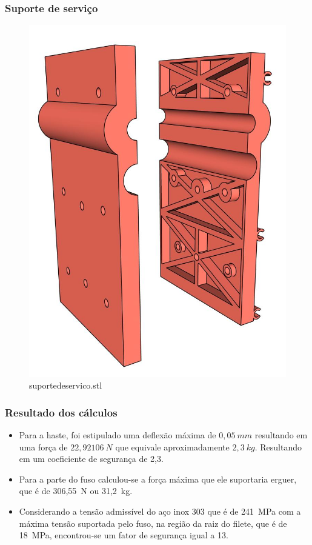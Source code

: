 \begin{frame}
    \frametitle{Suporte de serviço}
        \begin{figure}
            \centering
            \includegraphics[scale = 0.12]{figuras/ressuporteservicofrontaljuntoseparado}
            \caption{suportedeservico.stl}
        \end{figure}
\end{frame}

\begin{frame}
    \frametitle{Resultado dos cálculos}
    \begin{itemize}
        \item  Para a haste, foi estipulado uma deflexão máxima de $0,05~mm$ resultando em uma força de $22,92106~N$ 
        que equivale aproximadamente $2,3~kg$. Resultando em um coeficiente de segurança de 2,3.
        \item Para a parte do fuso calculou-se a força máxima que ele suportaria erguer, que é de
        306,55~N ou 31,2~kg. 
        \item Considerando a tensão admissível do aço inox 303 que é de 241~MPa com a máxima tensão 
        suportada pelo fuso, na região da raiz do filete, que é de 18~MPa, encontrou-se um fator de
        segurança igual a 13.        
    \end{itemize}
\end{frame}

